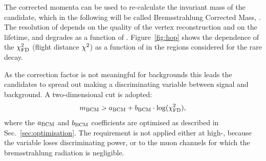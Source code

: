The corrected momenta can be used to re-calculate the invariant mass of the \Bz candidate, which in the following will be
called Bremsstrahlung Corrected Mass, \mbcm. The resolution of \mbcm depends on the quality of the vertex reconstruction
and on the \Bz lifetime, and degrades as a function of \qsq. Figure~\ref{fig:hop} shows the dependence of the \Bz $\chi^2_{\rm FD}$ 
(flight distance $\chi^2$) as a function of \mbcm in the \qsq regions considered for the rare decay. 

As the correction factor is not meaningful for backgrounds this leads the candidates to spread out making \mbcm 
a discriminating variable between signal and background. A two-dimensional cut is adopted:
$$m_{\rm BCM} > a_{\rm BCM} + b_{\rm BCM} \cdot \log(\chi^2_{\rm FD}),$$
where the $a_{\rm BCM}$ and $b_{\rm BCM}$ coefficients are optimised as described in Sec.~\ref{sec:optimisation}.
%
The requirement is not applied either at high-\qsq, because the variable loses discriminating power, or to the muon 
channels for which the bremsstrahlung radiation is negligible.




